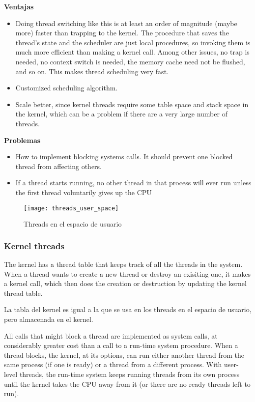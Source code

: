 \documentclass[a4paper, twoside]{article}
\begin{document}
\textbf{Ventajas}
\begin{itemize}
  \item Doing thread switching like this is at least an order of magnitude
  (maybe more) faster than trapping to the kernel.
  The procedure that saves the thread's state and the scheduler are just
  local procedures, so invoking them is much more efficient than making a
  kernel call.
  Among other issues, no trap is needed, no context switch is needed,
  the memory cache need not be flushed, and so on.
  This makes thread scheduling very fast.

  \item Customized scheduling algorithm.

  \item Scale better, since kernel threads require some table space and
  stack space in the kernel, which can be a problem if there are a very large
  number of threads.
\end{itemize}

\textbf{Problemas}
\begin{itemize}
  \item How to implement blocking systems calls.
  It should prevent one blocked thread from affecting others.

  \item If a thread starts running, no other thread in that process will
  ever run unless the first thread voluntarily gives up the CPU
\end{itemize}

\begin{figure}[h]
  \centering
  \texttt{[image: threads\_user\_space]}
  \caption{Threads en el espacio de usuario}
  \label{fig:threads_user_space}
\end{figure}

\subsubsection{Kernel threads}

The kernel has a thread table that keeps track of all the threads in
the system.
When a thread wants to create a new thread or destroy an exisiting one,
it makes a kernel call, which then does the creation or destruction by
updating the kernel thread table.

La tabla del kernel es igual a la que se usa en los threads en el espacio
de usuario, pero almacenada en el kernel.

All calls that might block a thread are implemented as system calls,
at considerably greater cost than a call to a run-time system procedure.
When a thread blocks, the kernel, at its options, can run either another thread
from the same process (if one is ready) or a thread from a different process.
With user-level threads, the run-time system keeps running threads from its
own process until the kernel takes the CPU away from it (or there are no ready
threads left to run).
\end{document}
